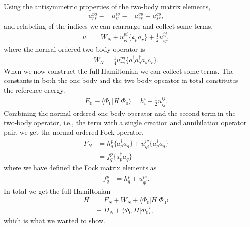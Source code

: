 \documentclass[
    a4paper, aps, twocolumn, floatfix, superscriptaddress,
    nofootinbib]{revtex4-1}
\newcommand{\1}{\mathds{1}}
\newcommand{\half}{\frac{1}{2}}
\newcommand{\bra}[1]{\langle #1\lvert}
\newcommand{\ket}[1]{\rvert #1\rangle}
\newcommand{\acr}[1]{a_{#1}^{\dagger}}
\newcommand{\ade}[1]{a_{#1}}
\newcommand{\kslat}{\ket{\Phi_0}}
\newcommand{\bslat}{\bra{\Phi_0}}
\begin{document}
    Using the antisymmetric properties of the two-body matrix elements,
    \begin{align}
        u^{pq}_{rs}
        = - u^{pq}_{sr}
        = - u^{qp}_{rs}
        = u^{qp}_{sr},
    \end{align}
    and relabeling of the indices we can rearrange and collect some terms.
    \begin{align}
        u
        &=
        W_N + u^{pi}_{ri}\{\acr{p}\ade{r}\}
        + \half u^{ij}_{ij},
    \end{align}
    where the normal ordered two-body operator is
    \begin{align}
        W_N = \frac{1}{4}
        u^{pq}_{rs}\{\acr{p}\acr{q}\ade{s}\ade{r}\}.
    \end{align}
    When we now construct the full Hamiltonian we can collect some terms. The
    constants in both the one-body and the two-body operator in total
    constitutes the reference energy.
    \begin{align}
        E_0 \equiv \bslat H\kslat
        = h_i^i + \frac{1}{2}u^{ij}_{ij}.
        \label{eq:reference_energy}
    \end{align}
    Combining the normal ordered one-body operator and the second term in the
    two-body operator, i.e., the term with a single creation and annihilation
    operator pair, we get the normal ordered Fock-operator.
    \begin{align}
        F_N
        &=
        h_{q}^{p}\{\acr{p}\ade{q}\}
        + u^{pi}_{qi}\{\acr{p}\ade{q}\}
        \\
        &= f_{q}^{p}\{\acr{p}\ade{q}\},
    \end{align}
    where we have defined the Fock matrix elements as
    \begin{align}
        f_{q}^{p}
        &=
        h_q^p + u^{pi}_{qi}.
    \end{align}
    In total we get the full Hamiltonian
    \begin{align}
        H
        &=
        F_N + W_N + \bslat H\kslat
        \\
        &= H_N + \bslat H\kslat,
    \end{align}
    which is what we wanted to show.\cite{crawford2007introduction}
\end{document}
